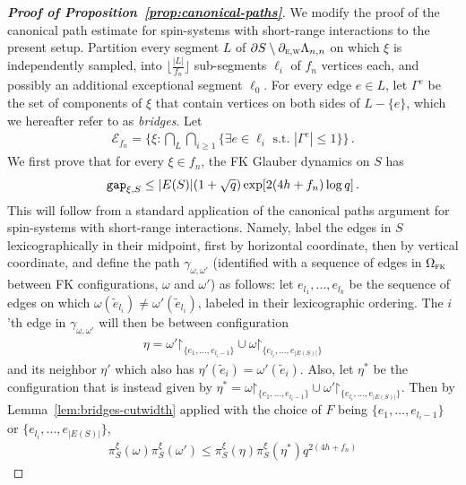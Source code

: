 \documentclass[reqno,11pt]{amsart}
\numberwithin{equation}{section}
\renewcommand{\restriction}{\mathord{\upharpoonright}}
\theoremstyle{definition}{
\newtheorem{example}[theorem]{Example}
\newtheorem{definition}[theorem]{Definition}
\newtheorem*{definition*}{Definition}
\newtheorem{problem}[theorem]{Problem}
\newtheorem{question}[theorem]{Question}
\newtheorem{remark}[theorem]{Remark}
}
\newcommand{\gap}{\text{\tt{gap}}}
\newcommand{\east}{{\textsc{e}}}
\newcommand{\west}{{\textsc{w}}}
\newcommand{\rc}{{\textsc{fk}}}
\begin{document}
\begin{proof}[\textbf{\emph{Proof of Proposition~\ref{prop:canonical-paths}}}]
We modify the proof of the canonical path estimate for spin-systems with short-range interactions to the present setup. Partition every segment $L$ of $\partial S\setminus \partial_{\east,\west} \Lambda_{n,n}$ on which $\xi$ is independently sampled, into $\lfloor\frac{|L|}{f_n}\rfloor$ sub-segments $\ell_i$ of $f_n $ vertices each, and possibly an additional exceptional segment $\ell_0$. For every edge $e\in L$, let $\Gamma^e$ be the set of components of $\xi$ that contain vertices on both sides of $L-\{e\}$, which we hereafter refer to as \emph{bridges}. Let
\begin{align}\label{eq:no-bridge-bc}
\mathcal E_{f_n} = \bigg\{\xi: \bigcap_L \bigcap_{i\geq 1} \{\exists e\in \ell_i \mbox{ s.t. } |\Gamma^e| \leq 1\} \bigg \}\,.
\end{align} 
We first prove that for every $\xi \in f_n$, the FK Glauber dynamics on $S$ has
\begin{align}\label{eq:gap-canonical-paths-bd}
\gap_{\xi,S} \leq |E(S)|(1+\sqrt q)\exp [2(4h+f_n) \log q ]\,. 
\end{align} 
This will follow from a standard application of the canonical paths argument for spin-systems with short-range interactions. Namely, label the edges in $S$ lexicographically in their midpoint, first by horizontal coordinate, then by vertical coordinate, and define the path $\gamma_{\omega,\omega'}$ (identified with a sequence of edges in $\Omega_\rc$ between FK configurations, $\omega$ and $\omega'$) as follows: let $e_{l_1},...,e_{l_k}$ be the sequence of edges on which $\omega(\tilde e_{l_i})\neq \omega'(\tilde e_{l_i})$, labeled in their lexicographic ordering. The $i$'th edge in $\gamma_{\omega,\omega'}$ will then be between configuration 
\begin{align*}
\eta=\omega'\restriction_{\{e_1,...,e_{l_i-1}\}} \cup \omega \restriction_{\{e_{l_i},...,e_{|E(S)|}\}}
\end{align*}
and its neighbor $\eta'$ which also has $\eta'(\tilde e_i) = \omega'(\tilde e_i)$. Also, let $\eta^*$ be the configuration that is instead given by $\eta^* = \omega\restriction_{\{e_1,...,e_{l_i -1}\}} \cup \omega'\restriction_{\{e_{l_i},...,e_{|E(S)|}\}}$.
Then by Lemma~\ref{lem:bridges-cutwidth} applied with the choice of $F$ being $\{e_1,...,e_{l_i - 1}\}$ or $\{e_{l_i},...,e_{|E(S)|}\}$, 
\begin{align*}
\pi_S^{\xi}(\omega)\pi_S^{\xi}(\omega') \leq \pi_S^{\xi}(\eta)\pi_S^{\xi}(\eta^*) q^{2(4h+f_n)}

\end{align*}
\end{proof}
\end{document}
